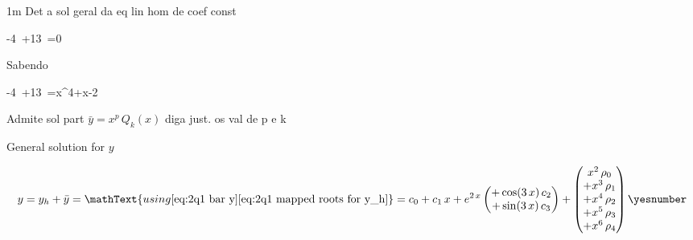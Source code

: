 \documentclass["AM3C-tests_resolutions.tex"]{subfiles}
\begin{document}
\group{}

\begin{questionBox}1m{} %
  Det a sol geral da eq lin hom de coef const
  \begin{BM}
    -4\,
    +13\,
    =0
  \end{BM}
  Sabendo
  \begin{BM}
    -4\,
    +13\,
    =x^4+x-2
  \end{BM}
  Admite sol part \(\bar{y}=x^p\,Q_k(x)\) diga just. os val de p e k
  


  General solution for \(y\)
  \begin{tcolorbox}
    \begin{gather*}
      y
      = y_h 
      + \bar{y}
      = \mathText{using 
        \eqref{eq:2q1 bar y}
        \eqref{eq:2q1 mapped roots for y_h}
      }
      = c_0+c_1\,x
      + e^{2\,x}
      \begin{pmatrix}
        + \cos(3\,x)\,c_2
        \\
        + \sin(3\,x)\,c_3
      \end{pmatrix}
      + \begin{pmatrix}
        x^2\,\rho_0
        \\+ x^3\,\rho_1
        \\+ x^4\,\rho_2
        \\+ x^5\,\rho_3
        \\+ x^6\,\rho_4
      \end{pmatrix}
      \yesnumber\label{eq:2q1 answer}
    \end{gather*}
  \end{tcolorbox}




\end{questionBox}
\end{document}
